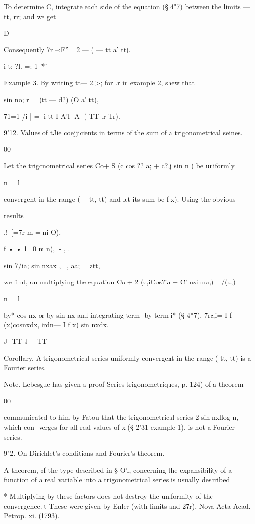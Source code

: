 To determine C, integrate each side of the equation (§ 4"7) between
the limits — tt, rr; and we get

D

Consequently 7r --:F''= 2 — ( — tt a' tt).

i t: ?l. =: 1 '*'

Example 3. By writing tt— 2.>; for .r in example 2, shew that

  sin no; r = (tt — d?) (O a' tt),

71=1 /i | = -i tt I A'l -A- (-TT .r Tr).

9'12. Values of tJie coejjicients in terms of the sum of a
trigonometrical seines.

00

Let the trigonometrical series Co+ S (c cos ?? a; + c?,j sin n ) be
uniformly

n = l

convergent in the range (— tt, tt) and let its sum be f x). Using the
obvious

results

.!\ [=7r m = ni O),

f • • 1=0 m n), |- , .

sin 7/ia; sin nxax , \ , aa; = ztt,

we find, on multiplying the equation Co + 2 (c,iCos?ia + C' nsinna;)
=/(a;)

n = l

by* cos nx or by sin nx and integrating term -by-term i* (§ 4*7),
7rc,i= I f (x)cosnxdx, irdn— I f x) sin nxdx.

J -TT J —TT

Corollary. A trigonometrical series uniformly convergent in the range
(-tt, tt) is a Fourier series.

Note. Lebesgue has given a proof Series trigonometriques, p. 124) of a
theorem

00

communicated to him by Fatou that the trigonometrical series 2 sin
nxllog n, which con- verges for all real values of x (§ 2'31 example
1), is not a Fourier series.

9"2. On Dirichlet's conditions and Fourier's theorem.

A theorem, of the type described in § O'l, concerning the
expansibility of a function of a real variable into a trigonometrical
series is usually described

* Multiplying by these factors does not destroy the uniformity of the
convergence. t These were given by Enler (with limits and 27r), Nova
Acta Acad. Petrop. xi. (1793).

